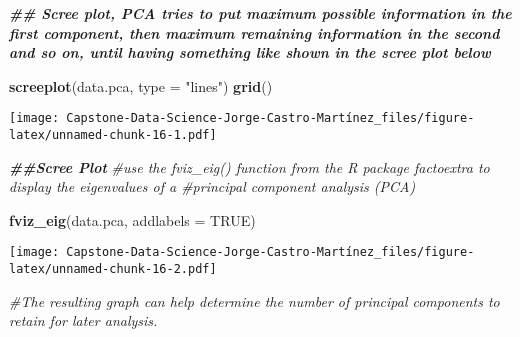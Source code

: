 \documentclass[
]{article}
\newenvironment{Shaded}{\begin{snugshade}}{\end{snugshade}}
\newcommand{\AttributeTok}[1]{\textcolor[rgb]{0.13,0.29,0.53}{#1}}
\newcommand{\CommentTok}[1]{\textcolor[rgb]{0.56,0.35,0.01}{\textit{#1}}}
\newcommand{\ConstantTok}[1]{\textcolor[rgb]{0.56,0.35,0.01}{#1}}
\newcommand{\DocumentationTok}[1]{\textcolor[rgb]{0.56,0.35,0.01}{\textbf{\textit{#1}}}}
\newcommand{\FunctionTok}[1]{\textcolor[rgb]{0.13,0.29,0.53}{\textbf{#1}}}
\newcommand{\NormalTok}[1]{#1}
\newcommand{\StringTok}[1]{\textcolor[rgb]{0.31,0.60,0.02}{#1}}
\begin{document}
\begin{Shaded}
\begin{Highlighting}[]
\DocumentationTok{\#\# Scree plot, PCA tries to put maximum possible information in the first component, then maximum remaining information in the second and so on, until having something like shown in the scree plot below}

\FunctionTok{screeplot}\NormalTok{(data.pca, }\AttributeTok{type =} \StringTok{"lines"}\NormalTok{)}
\FunctionTok{grid}\NormalTok{()}
\end{Highlighting}
\end{Shaded}

\texttt{[image: Capstone-Data-Science-Jorge-Castro-Martínez\_files/figure-latex/unnamed-chunk-16-1.pdf]}

\begin{Shaded}
\begin{Highlighting}[]
\DocumentationTok{\#\#Scree Plot }
\CommentTok{\#use the fviz\_eig() function from the R package factoextra to display the eigenvalues of a \#principal component analysis (PCA)}


\FunctionTok{fviz\_eig}\NormalTok{(data.pca, }\AttributeTok{addlabels =} \ConstantTok{TRUE}\NormalTok{)}
\end{Highlighting}
\end{Shaded}

\texttt{[image: Capstone-Data-Science-Jorge-Castro-Martínez\_files/figure-latex/unnamed-chunk-16-2.pdf]}

\begin{Shaded}
\begin{Highlighting}[]
\CommentTok{\#The resulting graph can help determine the number of principal components to retain for later analysis.}
\end{Highlighting}
\end{Shaded}
\end{document}
